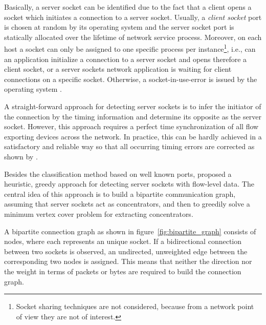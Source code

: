 Basically, a \gls{server socket} can be identified due to the fact that a client opens a socket which initiates a connection to a \gls{server socket}. Usually, a \emph{client socket} port is chosen at random by its operating system and the \gls{server socket} port is statically allocated over the lifetime of network service process. Moreover, on each host a socket can only be assigned to one specific process per instance\footnote{Socket sharing techniques are not considered, because from a network point of view they are not of interest.}, i.e., can an application initialize a connection to a server socket and opens therefore a client socket, or a \glspl{server socket} network application is waiting for client connections on a specific socket. Otherwise, a socket-in-use-error is issued by the operating system \citep{Schatzmann:Dissection}.

A straight-forward approach for detecting \glspl{server socket} is to infer the initiator of the connection by the timing information and determine its opposite as the \gls{server socket}. However, this approach requires a perfect time synchronization of all flow exporting devices across the network. In practice, this can be hardly achieved in a satisfactory and reliable way so that all occurring timing errors are corrected as shown by \citet{Trammell}.

Besides the classification method based on well known ports, \citet{Schatzmann:Mining,Schatzmann:Dissection,Schatzmann:Tracing} proposed a heuristic, greedy approach for detecting \glspl{server socket} with flow-level data. The central idea of this approach is to build a bipartite communication graph, assuming that server sockets act as concentrators, and then to greedily solve a minimum vertex cover problem for extracting concentrators.

A bipartite connection graph as shown in figure \ref{fig:bipartite_graph}  consists of nodes, where each represents an unique socket. If a bidirectional connection between two sockets is observed, an undirected, unweighted edge between the corresponding two nodes is assigned. This means that neither the direction nor the weight in terms of packets or bytes are required to build the connection graph.

